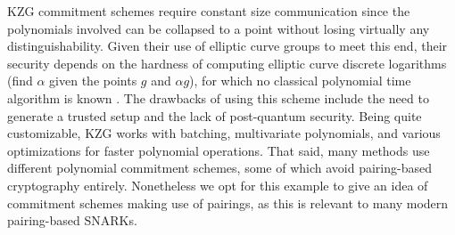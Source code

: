 \noindent KZG commitment schemes require constant size communication since the polynomials involved can be collapsed to a point without losing virtually any distinguishability. Given their use of elliptic curve groups to meet this end, their security depends on the hardness of computing elliptic curve discrete logarithms (find $\alpha$ given the points $g$ and $\alpha g$), for which no classical polynomial time algorithm is known \cite{ecdlp}. The drawbacks of using this scheme include the need to generate a trusted setup and the lack of post-quantum security. Being quite customizable, KZG works with batching, multivariate polynomials, and various optimizations for faster polynomial operations. That said, many methods use different polynomial commitment schemes, some of which avoid pairing-based cryptography entirely. Nonetheless we opt for this example to give an idea of commitment schemes making use of pairings, as this is relevant to many modern pairing-based SNARKs.
